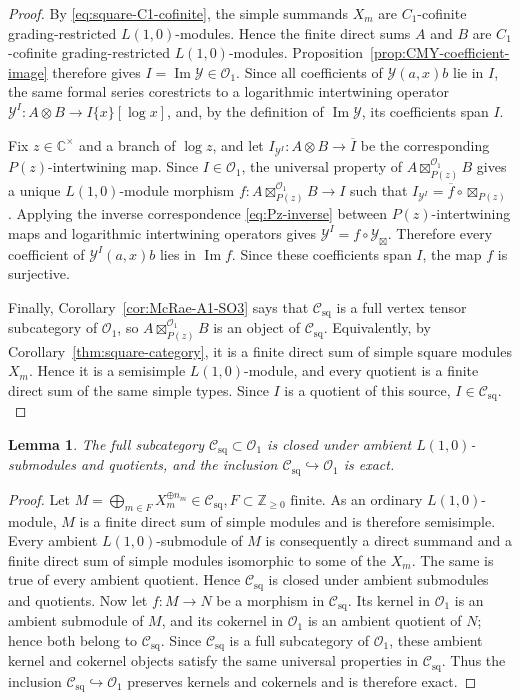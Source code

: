 \documentclass[12pt,leqno]{amsart}
\numberwithin{equation}{section} \newtheorem{thm}{Theorem}[section] \newtheorem{lem}[thm]{Lemma} \newtheorem{ex}[thm]{Example} \newtheorem{prop}[thm]{Proposition} \newtheorem{cor}[thm]{Corollary} \newtheorem{defi}[thm]{Definition} \newtheorem{rmk}[thm]{Remark} \newtheorem{notation}[thm]{Notation}
\newcommand{\Csq}{\mathcal C_{\mathrm{sq}}}
\newcommand{\Ovir}{\mathcal O_1}
\def\Z{\mathbb{Z}} \def\N{\mathbb{N}} \def\A{\mathbb{A}} \def\C{\mathbb{C}} \def\R{\mathbb{R}} \def\Q{\mathbb{Q}} \def\F{\mathbb{F}}
\begin{document}
\begin{proof}
By \eqref{eq:square-C1-cofinite}, the simple summands $X_m$ are $C_1$-cofinite grading-restricted $L(1,0)$-modules. Hence the finite direct sums $A$ and $B$ are $C_1$-cofinite grading-restricted $L(1,0)$-modules. Proposition~\ref{prop:CMY-coefficient-image} therefore gives \(I=\operatorname{Im}\mathcal Y\in\Ovir.\) Since all coefficients of $\mathcal Y(a,x)b$ lie in $I$, the same formal series corestricts to a logarithmic intertwining operator \(\mathcal Y^I:A\otimes B\longrightarrow I\{x\}[\log x]\), and, by the definition of $\operatorname{Im}\mathcal Y$, its coefficients span $I$.

Fix $z\in\C^\times$ and a branch of $\log z$, and let \(I_{\mathcal Y^I}:A\otimes B\longrightarrow\overline I\) be the corresponding $P(z)$-intertwining map. Since $I\in\Ovir$, the universal property of $A\boxtimes^{\Ovir}_{P(z)}B$ gives a unique $L(1,0)$-module morphism \(f:A\boxtimes^{\Ovir}_{P(z)}B\longrightarrow I\) such that \(I_{\mathcal Y^I}=\overline f\circ\boxtimes_{P(z)}\). Applying the inverse correspondence \eqref{eq:Pz-inverse} between $P(z)$-intertwining maps and logarithmic intertwining operators gives \(\mathcal Y^I=f\circ\mathcal Y_{\boxtimes}\). Therefore every coefficient of $\mathcal Y^I(a,x)b$ lies in $\operatorname{Im}f$. Since these coefficients span $I$, the map $f$ is surjective.

Finally, Corollary~\ref{cor:McRae-A1-SO3} says that $\Csq$ is a full vertex tensor subcategory of $\Ovir$, so $A\boxtimes^{\Ovir}_{P(z)}B$ is an object of $\Csq$. Equivalently, by Corollary~\ref{thm:square-category}, it is a finite direct sum of simple square modules $X_m$. Hence it is a semisimple $L(1,0)$-module, and every quotient is a finite direct sum of the same simple types. Since $I$ is a quotient of this source, \(I\in\Csq.\)
\end{proof}

\begin{lem}\label{lem:square-ambient-Serre}
The full subcategory $\Csq\subset\Ovir$ is closed under ambient $L(1,0)$-submodules and quotients, and the inclusion $\Csq\hookrightarrow\Ovir$ is exact.
\end{lem}

\begin{proof}
Let \(M=\bigoplus_{m\in F}X_m^{\oplus n_m}\in\Csq,F\subset\Z_{\ge0}\text{ finite}.\) As an ordinary $L(1,0)$-module, $M$ is a finite direct sum of simple modules and is therefore semisimple. Every ambient $L(1,0)$-submodule of $M$ is consequently a direct summand and a finite direct sum of simple modules isomorphic to some of the $X_m$. The same is true of every ambient quotient. Hence $\Csq$ is closed under ambient submodules and quotients. Now let $f:M\to N$ be a morphism in $\Csq$. Its kernel in $\Ovir$ is an ambient submodule of $M$, and its cokernel in $\Ovir$ is an ambient quotient of $N$; hence both belong to $\Csq$. Since $\Csq$ is a full subcategory of $\Ovir$, these ambient kernel and cokernel objects satisfy the same universal properties in $\Csq$. Thus the inclusion $\Csq\hookrightarrow\Ovir$ preserves kernels and cokernels and is therefore exact.
\end{proof}
\end{document}
